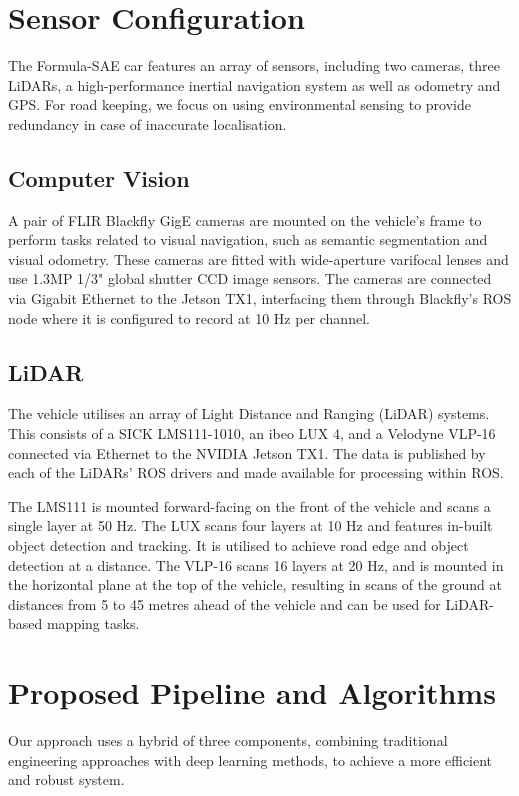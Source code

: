 \section{Sensor Configuration}
The Formula-SAE car features an array of sensors, including two cameras, three LiDARs, a high-performance inertial navigation system as well as odometry and GPS. For road keeping, we focus on using environmental sensing to provide redundancy in case of inaccurate localisation.

\subsection{Computer Vision}
A pair of FLIR Blackfly GigE cameras are mounted on the vehicle’s frame to perform tasks related to visual navigation, such as semantic segmentation and visual odometry.  These cameras are fitted with wide-aperture varifocal lenses and use 1.3MP 1/3" global shutter CCD image sensors. The cameras are connected via Gigabit Ethernet to the Jetson TX1, interfacing them through Blackfly’s ROS node where it is configured to record at 10 Hz per channel.

\subsection{LiDAR}
The vehicle utilises an array of Light Distance and Ranging (LiDAR) systems. This consists of a SICK LMS111-1010, an ibeo LUX 4, and a Velodyne VLP-16 connected via Ethernet to the NVIDIA Jetson TX1. The data is published by each of the LiDARs’ ROS drivers and made available for processing within ROS. 

The LMS111 is mounted forward-facing on the front of the vehicle and scans a single layer at 50 Hz. The LUX scans four layers at 10 Hz and features in-built object detection and tracking. It is utilised to achieve road edge and object detection at a distance. The VLP-16 scans 16 layers at 20 Hz, and is mounted in the horizontal plane at the top of the vehicle, resulting in scans of the ground at distances from 5 to 45 metres ahead of the vehicle and can be used for LiDAR-based mapping tasks.

\section{Proposed Pipeline and Algorithms}
Our approach uses a hybrid of three components, combining traditional engineering approaches with deep learning methods, to achieve a more efficient and robust system.

